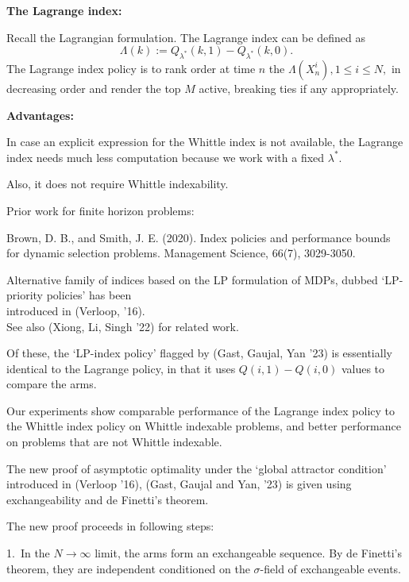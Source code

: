 \documentclass{slides}
\begin{document}
\newpage
{\large \color{dred} 

\textbf{The Lagrange index:}

Recall the Lagrangian formulation. The {Lagrange index} can be defined as
$$\Lambda (k) := Q_{\lambda^*}(k,1) - Q_{\lambda^*}(k,0).$$
The Lagrange index policy is to rank order at time $n$ the $\Lambda(X^i_n), 1 \leq i \leq N,$ in decreasing order and render the top $M$ active, breaking ties if any appropriately.

\newpage

\textbf{Advantages:}

In case an explicit expression for the Whittle index is not available, the Lagrange index needs much less computation because we work with a fixed $\lambda^*$.  

Also, it does not require Whittle indexability.

Prior work for finite horizon problems:

Brown, D. B., and Smith, J. E. (2020).
Index policies and performance bounds for dynamic selection problems.
Management Science, 66(7), 3029-3050.

\newpage

Alternative family of indices based on the LP formulation of MDPs, dubbed `LP-priority policies'  has been\\ introduced in (Verloop, '16).\\ See also (Xiong, Li, Singh '22) for related work. 

Of these, the `LP-index policy' flagged by (Gast, Gaujal,  Yan '23) is essentially identical to the Lagrange policy, in that it uses $Q(i,1) - Q(i,0)$ values to compare the arms. 

\newpage

Our experiments show comparable performance of the Lagrange index policy to the Whittle index policy on Whittle indexable problems, and better performance on problems that are not Whittle indexable.

The new proof of asymptotic optimality  under the `global attractor condition' introduced in (Verloop '16), (Gast, Gaujal and Yan, '23) is given using exchangeability and de Finetti's theorem.

\newpage

The new proof proceeds in following steps:

1.\ In the $N \to \infty$ limit, the arms form an exchangeable sequence. By de Finetti's theorem, they are independent conditioned on the $\sigma$-field of exchangeable events.

}
\end{document}
